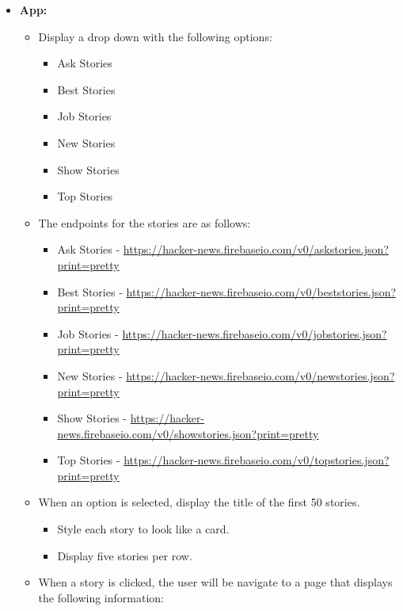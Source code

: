 \documentclass{article}
\begin{document}
\begin{itemize}
	\item \textbf{App:}
\begin{itemize}
	\item Display a drop down with the following options:
	\begin{itemize}
		\item Ask Stories
		\item Best Stories
		\item Job Stories
		\item New Stories
		\item Show Stories
		\item Top Stories
	\end{itemize}
	\item The endpoints for the stories are as follows:
	\begin{itemize}
		\item Ask Stories - \href{https://hacker-news.firebaseio.com/v0/askstories.json?print=pretty}{https://hacker-news.firebaseio.com/v0/askstories.json?print=pretty}
		\item Best Stories - \href{https://hacker-news.firebaseio.com/v0/beststories.json?print=pretty}{https://hacker-news.firebaseio.com/v0/beststories.json?print=pretty}
		\item Job Stories - \href{https://hacker-news.firebaseio.com/v0/jobstories.json?print=pretty}{https://hacker-news.firebaseio.com/v0/jobstories.json?print=pretty}
		\item New Stories - \href{https://hacker-news.firebaseio.com/v0/newstories.json?print=pretty}{https://hacker-news.firebaseio.com/v0/newstories.json?print=pretty}
		\item Show Stories - \href{https://hacker-news.firebaseio.com/v0/showstories.json?print=pretty}{https://hacker-news.firebaseio.com/v0/showstories.json?print=pretty}
		\item Top Stories - \href{https://hacker-news.firebaseio.com/v0/topstories.json?print=pretty}{https://hacker-news.firebaseio.com/v0/topstories.json?print=pretty}
	\end{itemize}
	\item When an option is selected, display the title of the first 50 stories.
	\begin{itemize}
		\item Style each story to look like a card.
		\item Display five stories per row.
	\end{itemize}
	\item When a story is clicked, the user will be navigate to a page that displays the following information:

\end{itemize}
\end{itemize}
\end{document}
